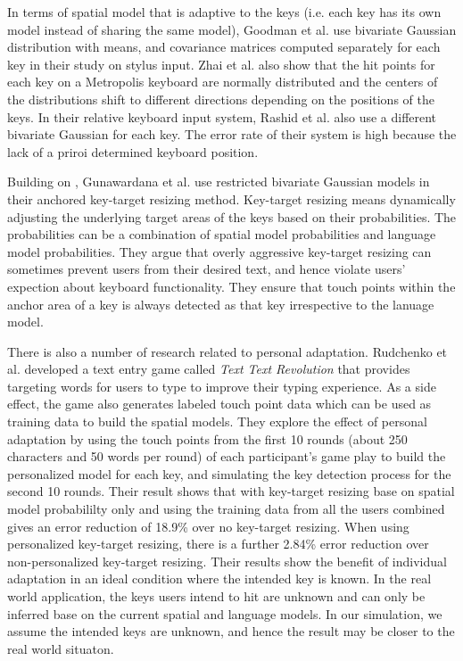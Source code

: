 \documentclass{sigchi}
\begin{document}
In terms of spatial model that is adaptive to the keys (i.e. each key has its own model instead of
sharing the same model), Goodman et al. \cite{Goodman:2002} use bivariate Gaussian distribution with means, and
covariance matrices computed separately for each key in their study on stylus input. Zhai et al. \cite{Zhai:2002} also show that
the hit points for each key on a Metropolis keyboard \cite{Zhai:2000} are normally distributed and 
the centers of the distributions shift to different directions depending on the positions of
the keys. In their relative keyboard input system, Rashid et al. \cite{Rashid:2008} also use a different bivariate
Gaussian for each key. The error rate of their system is high because the lack of 
a priroi determined keyboard position.

Building on \cite{Goodman:2002}, Gunawardana et al. \cite{Gunawardana:2010} use restricted bivariate Gaussian
models in their anchored key-target resizing method. Key-target resizing means dynamically
adjusting the underlying target areas of the keys based on their probabilities. The probabilities can 
be a combination of spatial model probabilities and language model probabilities.
They argue that overly aggressive
key-target resizing can sometimes prevent users from their desired text, and hence violate
users' expection about keyboard functionality. They ensure that touch points within
the anchor area of a key is always detected as that key irrespective to the lanuage model.

There is also a number of research related to personal adaptation. 
Rudchenko et al. \cite{Rudchenko:2011}
developed a text entry game called \textit{Text Text Revolution} that provides 
targeting words for users to type to improve their typing experience. As a side effect,
the game also generates labeled touch point data which can be used as
training data to build the spatial models. They explore the effect of personal adaptation
by using the touch points from the first 10 rounds (about 250 characters and 50 words per round) of each 
participant's game play to build the personalized model for each key, and simulating the key detection
process for the second 10 rounds. Their result shows that with key-target resizing base on
spatial model probabililty only and using the training data from all the users combined
gives an error reduction of 18.9\% over no key-target resizing. When using personalized
key-target resizing, there is a further 2.84\% error reduction over non-personalized key-target resizing.
Their results show the benefit of individual adaptation in an ideal condition where the 
intended key is known. In the real world application, the keys users intend to hit are unknown and
can only be inferred base on the current spatial and language models. In our simulation, we assume the 
intended keys are unknown, and hence the result may be closer to the real world situaton. 
\end{document}

